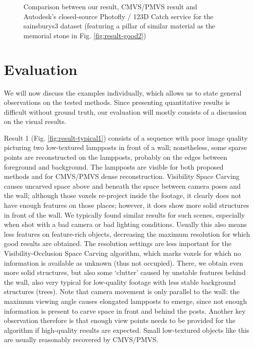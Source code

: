 \begin{figure}[htb!]
{ }
 \caption{Comparison between our result, CMVS/PMVS \cite{Furukawa2010} result and Autodesk's closed-source Photofly / 123D Catch service for the sainsburys3 dataset (featuring a pillar of similar material as the memorial stone in Fig. \ref{fig:result-good2})}
 \label{fig:photofly}
\end{figure}


\clearpage
\section{Evaluation}

We will now discuss the examples individually, which allows us to state general observations on the tested methods. Since presenting quantitative results is difficult without ground truth, our evaluation will mostly consists of a discussion on the visual results.

Result 1 (Fig. \ref{fig:result-typical1}) consists of a sequence with poor image quality picturing two low-textured lampposts in front of a wall; nonetheless, some sparse points are reconstructed on the lampposts, probably on the edges between foreground and background. The lampposts are visible for both proposed methods and for CMVS/PMVS dense reconstruction. Visibility Space Carving causes uncarved space above and beneath the space between camera poses and the wall; although those voxels re-project inside the footage, it clearly does not have enough features on those places; however, it does show more solid structures in front of the wall. We typically found similar results for such scenes, especially when shot with a bad camera or bad lighting conditions. Usually this also means less features on feature-rich objects, decreasing the maximum resolution for which good results are obtained. The resolution settings are less important for the Visibility-Occlusion Space Carving algorithm, which marks voxels for which no information is available as unknown (thus not occupied). There, we obtain even more solid structures, but also some `clutter' caused by unstable features behind the wall, also very typical for low-quality footage with less stable background structures (\eg trees). Note that camera movement is only parallel to the wall: the maximum viewing angle causes elongated lampposts to emerge, since not enough information is present to carve space in front and behind the posts. Another key observation therefore is that enough view points needs to be provided for the algorithm if high-quality results are expected. Small low-textured objects like this are usually reasonably recovered by CMVS/PMVS.

